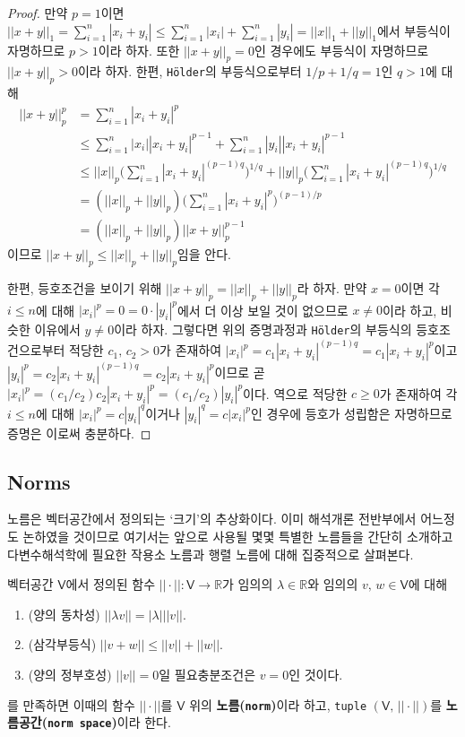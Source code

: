 \begin{proof}
    만약 $p=1$이면 $||x+y||_1=\sum_{i=1}^n|x_i+y_i|\leq\sum_{i=1}^n|x_i|+\sum_{i=1}^n|y_i|=||x||_1+||y||_1$에서 부등식이 자명하므로 $p>1$이라 하자. 또한 $||x+y||_p=0$인 경우에도 부등식이 자명하므로 $||x+y||_p>0$이라 하자. 한편, \texttt{H\"older}의 부등식으로부터 $1/p+1/q=1$인 $q>1$에 대해
    \begin{align*}
        ||x+y||_p^p&=\sum_{i=1}^n|x_i+y_i|^p\\
        &\leq\sum_{i=1}^n|x_i||x_i+y_i|^{p-1}+\sum_{i=1}^n|y_i||x_i+y_i|^{p-1}\\
        &\leq||x||_p\bigg(\sum_{i=1}^n|x_i+y_i|^{(p-1)q}\bigg)^{1/q}+||y||_p\bigg(\sum_{i=1}^n|x_i+y_i|^{(p-1)q}\bigg)^{1/q}\\
        &=(||x||_p+||y||_p)\bigg(\sum_{i=1}^n|x_i+y_i|^p\bigg)^{(p-1)/p}\\
        &=(||x||_p+||y||_p)||x+y||_p^{p-1}
    \end{align*}
    이므로 $||x+y||_p\leq||x||_p+||y||_p$임을 안다.

    한편, 등호조건을 보이기 위해 $||x+y||_p=||x||_p+||y||_p$라 하자. 만약 $x=0$이면 각 $i\leq n$에 대해 $|x_i|^p=0=0\cdot|y_i|^p$에서 더 이상 보일 것이 없으므로 $x\ne0$이라 하고, 비슷한 이유에서 $y\ne0$이라 하자. 그렇다면 위의 증명과정과 \texttt{H\"older}의 부등식의 등호조건으로부터 적당한 $c_1,\,c_2>0$가 존재하여 $|x_i|^p=c_1|x_i+y_i|^{(p-1)q}=c_1|x_i+y_i|^p$이고 $|y_i|^p=c_2|x_i+y_i|^{(p-1)q}=c_2|x_i+y_i|^p$이므로 곧 $|x_i|^p=(c_1/c_2)c_2|x_i+y_i|^p=(c_1/c_2)|y_i|^p$이다. 역으로 적당한 $c\geq0$가 존재하여 각 $i\leq n$에 대해 $|x_i|^p=c|y_i|^q$이거나 $|y_i|^q=c|x_i|^p$인 경우에 등호가 성립함은 자명하므로 증명은 이로써 충분하다.
\end{proof}

\subsection{Norms}

노름은 벡터공간에서 정의되는 `크기'의 추상화이다. 이미 해석개론 전반부에서 어느정도 논하였을 것이므로 여기서는 앞으로 사용될 몇몇 특별한 노름들을 간단히 소개하고 다변수해석학에 필요한 작용소 노름과 행렬 노름에 대해 집중적으로 살펴본다.

\begin{definition}
    벡터공간 $\mathsf{V}$에서 정의된 함수 $||\cdot||:\mathsf{V}\to\mathbb{R}$가 임의의 $\lambda\in\mathbb{R}$와 임의의 $v,\,w\in\mathsf{V}$에 대해
    \begin{enumerate}
        \item (양의 동차성) $||\lambda v||=|\lambda|||v||$.
        \item (삼각부등식) $||v+w||\leq||v||+||w||$.
        \item (양의 정부호성) $||v||=0$일 필요충분조건은 $v=0$인 것이다.
    \end{enumerate}
    를 만족하면 이때의 함수 $||\cdot||$를 $\mathsf{V}$ 위의 \textbf{노름(\texttt{norm})}이라 하고, \texttt{tuple} $(\mathsf{V},\,||\cdot||)$를 \textbf{노름공간(\texttt{norm space})}이라 한다.
\end{definition}

